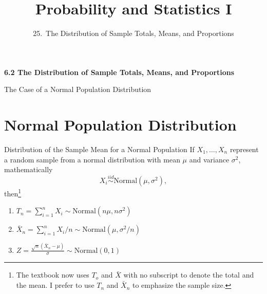 
  
\newcommand{\lecturenum}{25}

\title[SS2857]{Probability and Statistics I}
\subtitle{\lecturenum.~The Distribution of Sample Totals, Means, and Proportions}

\date{}






{

\begin{frame}
  \addtocounter{framenumber}{-1}

  \maketitle
\end{frame}
}

\begin{frame}
  \frametitle{}
  
  \begin{center}
    \Large{\textbf{6.2 The Distribution of Sample Totals, Means, and Proportions}}

    \bigskip

    The Case of a Normal Population Distribution

  \end{center}
  
\end{frame}

\section{Normal Population Distribution}

\begin{frame}
  \begin{block}{Distribution of the Sample Mean for a Normal Population}
    If $X_1,\ldots,X_n$ represent a random sample from a normal distribution with mean $\mu$ and variance $\sigma^2$, mathematically
    \[
      X_i\overset{iid}{\sim}\mbox{Normal}(\mu,\sigma^2),
    \]
    then\footnote{The textbook now uses $T_o$ and $\bar X$ with no subscript to denote the total and the mean. I prefer to use $T_n$ and $\bar X_n$ to emphasize the sample size.}
    \begin{enumerate}
    \item $T_n=\sum_{i=1}^n X_i \sim \mbox{Normal}(n\mu,n\sigma^2)$
    \item $\bar X_n= \sum_{i=1}^n X_i/n \sim \mbox{Normal}(\mu,\sigma^2/n)$ 
    \item $Z=\frac{\sqrt{n}(\bar X_n - \mu)}{\sigma} \sim \mbox{Normal}(0,1)$
    \end{enumerate}
  \end{block}
\end{frame}

